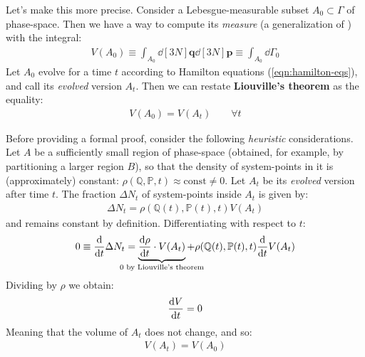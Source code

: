 \documentclass[../../main.tex]{subfiles}
\begin{document}
\medskip

Let's make this more precise. Consider a Lebesgue-measurable subset $A_0 \subset \Gamma$ of phase-space. Then we have a way to compute its \textit{measure} (a generalization of ) with the integral:
\begin{align*}
    V(A_0) \equiv \int_{A_0} \dd[3N]{\bm{q}} \dd[3N]{\bm{p}} \equiv \int_{A_0} \dd{\Gamma_0}
\end{align*} 
Let $A_0$ evolve for a time $t$ according to Hamilton equations (\ref{eqn:hamilton-eqs}), and call its \textit{evolved} version $A_t$. Then we can restate \textbf{Liouville's theorem} as the equality:
\begin{align}\label{eqn:Liouville-volumes}
    V(A_0) = V(A_t) \qquad \forall t
\end{align} 

Before providing a formal proof, consider the following \textit{heuristic} considerations. Let $A$ be a sufficiently small region of phase-space (obtained, for example, by partitioning a larger region $B$), so that the density of system-points in it is (approximately) constant: $\rho(\mathbb{Q},\mathbb{P},t) \approx \mathrm{const} \neq 0$. Let $A_t$ be its \textit{evolved} version after time $t$. The fraction $\Delta N_t$ of system-points inside $A_t$ is given by:
\begin{align*}
    \Delta N_t = \rho(\mathbb{Q}(t), \mathbb{P}(t), t) V(A_t)
\end{align*}
and remains constant by definition. Differentiating with respect to $t$:
\begin{align*}
    0 \equiv \dv{t} \Delta N_t = \underbrace{\dv{\rho}{t} (\mathbb{Q}(t), \mathbb{P}(t), t) \cdot V(A_t)}_{\mathclap{0 \text{ by Liouville's theorem}}} + \rho(\mathbb{Q}(t), \mathbb{P}(t), t) \dv{t} V(A_t)
\end{align*}
Dividing by $\rho$ we obtain:
\begin{align*}
    \dv{V}{t} (A_t) = 0
\end{align*}
Meaning that the volume of $A_t$ does not change, and so:
\begin{align*}
    V(A_t) = V(A_0)
\end{align*}

\medskip
\end{document}
